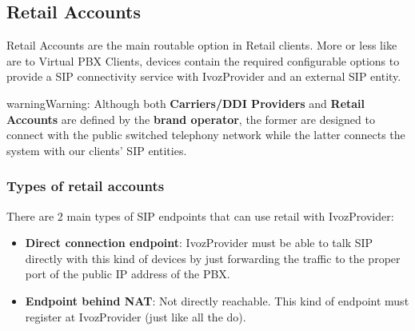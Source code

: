 \documentclass[letterpaper,10pt,english]{sphinxmanual}
\begin{document}
\subsection{Retail Accounts}
\label{administration_portal/client/retail/retail_accounts::doc}\label{administration_portal/client/retail/retail_accounts:retail-accounts}\label{administration_portal/client/retail/retail_accounts:id1}
Retail Accounts are the main routable option in Retail clients.
More or less like {\hyperref[administration_portal/client/vpbx/routing_endpoints/friends/index:friends]{}} are to Virtual PBX Clients, devices
contain the required configurable options to provide a SIP connectivity
service with IvozProvider and an external SIP entity.

\begin{notice}{warning}{Warning:}
Although both \textbf{Carriers/DDI Providers} and \textbf{Retail Accounts} are defined by the
\textbf{brand operator}, the former are designed to connect with the public switched telephony network
while the latter connects the system with our clients' SIP entities.
\end{notice}


\subsubsection{Types of retail accounts}
\label{administration_portal/client/retail/retail_accounts:types-of-retail-accounts}
There are 2 main types of SIP endpoints that can use retail with IvozProvider:
\begin{itemize}
\item {} 
\textbf{Direct connection endpoint}: IvozProvider must be able to talk SIP directly with
this kind of devices by just forwarding the traffic to the proper port of
the public IP address of the PBX.

\item {} 
\textbf{Endpoint behind NAT}: Not directly reachable. This kind of endpoint must register at
IvozProvider (just like all the {\hyperref[administration_portal/client/vpbx/terminals:terminals]{}} do).

\end{itemize}
\end{document}
